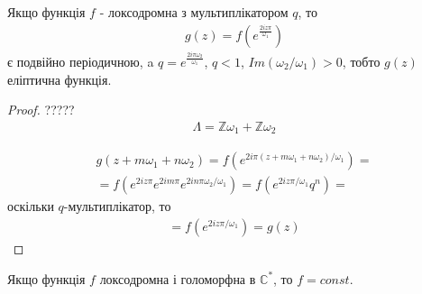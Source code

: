 \documentclass[12pt,a4paper]{article}
\begin{document}
\begin{twerd}
 Якщо функція $f$ - локсодромна з мультиплікатором $q$, то  
\[\begin{array}{l}
g(z)=f(e^{\frac{2iz\pi}{\omega_{1}}})
\end{array}\] 
є подвійно періодичною, a\hspace{0,5cm} $q=e^{\frac{2i\pi \omega_{2}}{ \omega_{1}}}$,\hspace{0,5cm} $q<1$, \hspace{0,5cm}  $Im(\omega_{2}/\omega_{1})>0$, тобто $g(z)$ еліптична функція.
\end{twerd}
\begin{proof}?????
\[\begin{array}{l}
\Lambda = \mathbb{Z}\omega_{1} + \mathbb{Z}\omega_{2} 
\end{array}\]

\[\begin{array}{l}
g(z+m\omega_{1}+ n\omega_{2})= f(e^{2i\pi(z+m\omega_{1}+ n\omega_{2})/\omega_{1}})=\\
=f( e^{2iz\pi}e^{2im\pi}e^{2in\pi\omega_{2} / \omega_{1}})=
f(e^{2iz\pi/\omega_{1}}q^{n})=
\end{array}\]
 оскільки $q$-мультиплікатор, то
 \[\begin{array}{l}
 =f(e^{2iz\pi/\omega_{1}})=g(z)
 \end{array}\]
\end{proof}
\vspace{1cm}

\begin{thm}
Якщо функція $f$ локсодромна і голоморфна в $\mathbb{C}^{*}$, то $f=const$.
\end{thm}
\end{document}
